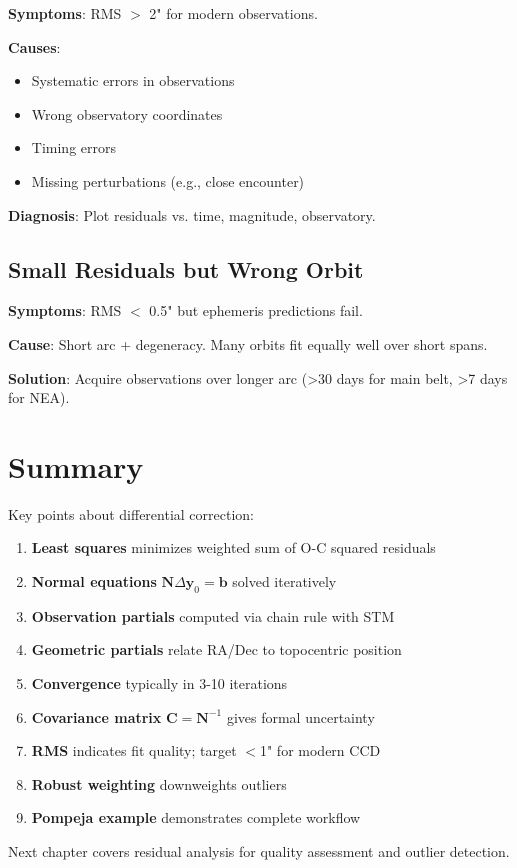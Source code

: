 \textbf{Symptoms}: RMS $>$ 2" for modern observations.

\textbf{Causes}:
\begin{itemize}
    \item Systematic errors in observations
    \item Wrong observatory coordinates
    \item Timing errors
    \item Missing perturbations (e.g., close encounter)
\end{itemize}

\textbf{Diagnosis}: Plot residuals vs. time, magnitude, observatory.

\subsection{Small Residuals but Wrong Orbit}

\textbf{Symptoms}: RMS $<$ 0.5" but ephemeris predictions fail.

\textbf{Cause}: Short arc + degeneracy. Many orbits fit equally well over short spans.

\textbf{Solution}: Acquire observations over longer arc (>30 days for main belt, >7 days for NEA).

\section{Summary}

Key points about differential correction:

\begin{enumerate}
    \item \textbf{Least squares} minimizes weighted sum of O-C squared residuals
    \item \textbf{Normal equations} $\mathbf{N}\Delta\mathbf{y}_0 = \mathbf{b}$ solved iteratively
    \item \textbf{Observation partials} computed via chain rule with STM
    \item \textbf{Geometric partials} relate RA/Dec to topocentric position
    \item \textbf{Convergence} typically in 3-10 iterations
    \item \textbf{Covariance matrix} $\mathbf{C} = \mathbf{N}^{-1}$ gives formal uncertainty
    \item \textbf{RMS} indicates fit quality; target $<$1" for modern CCD
    \item \textbf{Robust weighting} downweights outliers
    \item \textbf{Pompeja example} demonstrates complete workflow
\end{enumerate}

Next chapter covers residual analysis for quality assessment and outlier detection.

